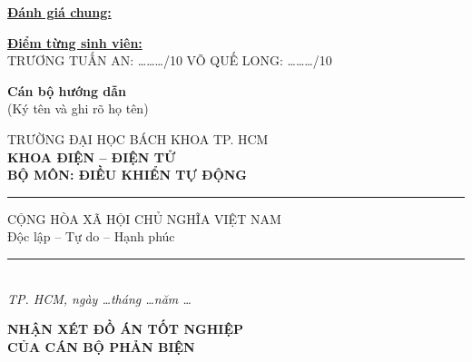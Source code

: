 \documentclass[12pt,a4paper]{article}
\begin{document}
\vspace{0.2cm}

\noindent \underline{\textbf{Đánh giá chung:}} \dotfill \\
\dotfill

\vspace{0.3cm}

\noindent \underline{\textbf{Điểm từng sinh viên:}} \\[0.1cm]
\small TRƯƠNG TUẤN AN: \dots\dots\dots/10 \hfill VÕ QUẾ LONG: \dots\dots\dots/10 \hspace{2cm}

\vspace{0.3cm}

\hfill
\begin{minipage}[t]{0.45\textwidth}
    \centering
    \textbf{Cán bộ hướng dẫn} \\
    \vspace{0.1cm}
    (Ký tên và ghi rõ họ tên)
\end{minipage}

\newpage

\noindent
\begin{minipage}[t]{0.48\textwidth}
    \centering
    {\small TRƯỜNG ĐẠI HỌC BÁCH KHOA TP. HCM} \\
    \textbf{KHOA ĐIỆN -- ĐIỆN TỬ} \\
    \textbf{BỘ MÔN: ĐIỀU KHIỂN TỰ ĐỘNG} \\
    \vspace{0.1cm}
    \rule{3.5cm}{0.5pt}
\end{minipage}
\hfill
\begin{minipage}[t]{0.48\textwidth}
    \centering
    {\small CỘNG HÒA XÃ HỘI CHỦ NGHĨA VIỆT NAM} \\
    {\small Độc lập -- Tự do -- Hạnh phúc} \\
    \vspace{0.1cm}
    \rule{4cm}{0.5pt} \\
    \vspace{0.2cm}
    \textit{\small TP. HCM, ngày \dots tháng \dots năm \dots}
\end{minipage}

\vspace{0.5cm}

\begin{center}
    {\large \textbf{NHẬN XÉT ĐỒ ÁN TỐT NGHIỆP}} \\[0.1cm]
    {\large \textbf{CỦA CÁN BỘ PHẢN BIỆN}}
\end{center}
\end{document}
